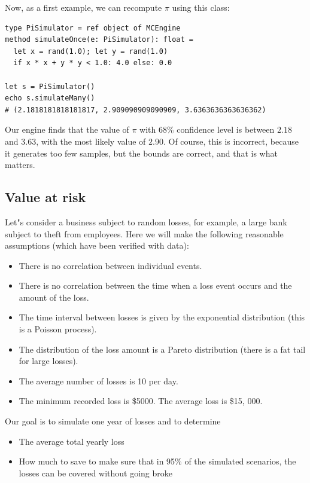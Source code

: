 \documentclass[justified, sixbynine]{tufte-book}
\theoremstyle{plain}%
\newtheorem * {corollary}{Corollary}
\theoremstyle{definition}
\theoremstyle{remark}
\newtheorem * {remark}{Remark}
\newtheorem * {note}{Note}
\begin{document}
\begin{fullwidth}
Now, as a first example, we can recompute $\pi$ using this class:


\begin{lstlisting}
type PiSimulator = ref object of MCEngine
method simulateOnce(e: PiSimulator): float =
  let x = rand(1.0); let y = rand(1.0)
  if x * x + y * y < 1.0: 4.0 else: 0.0

let s = PiSimulator()
echo s.simulateMany()
# (2.1818181818181817, 2.909090909090909, 3.6363636363636362)
\end{lstlisting}

Our engine finds that the value of $\pi$ with 68\% confidence level is between $2.18$ and $3.63$, with the most likely value of $2.90$. Of course, this is incorrect, because it generates too few samples, but the bounds are correct, and that is what matters.

\subsection{Value at risk}

Let"s consider a business subject to random losses, for example, a large bank subject to theft from employees.
Here we will make the following reasonable assumptions (which have been verified with data):
\begin{itemize}
\item There is no correlation between individual events.
\item There is no correlation between the time when a loss event occurs and the amount of the loss.
\item The time interval between losses is given by the exponential distribution (this is a Poisson process).
\item The distribution of the loss amount is a Pareto distribution (there is a fat tail for large losses).
\item The average number of losses is 10 per day.
\item The minimum recorded loss is \$5000. The average loss is \$15, 000.
\end{itemize}

Our goal is to simulate one year of losses and to determine

\begin{itemize}
\item The average total yearly loss
\item How much to save to make sure that in 95\% of the simulated scenarios, the losses can be covered without going broke
\end{itemize}


\end{fullwidth}
\end{document}
